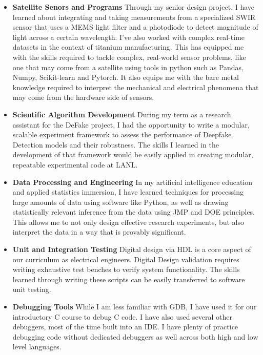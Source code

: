 \begin{itemize}
    \item \textbf{Satellite Senors and Programs} Through my senior 
    design project, I have learned about integrating and taking 
    measurements from a specialized SWIR sensor that uses a MEMS 
    light filter and a photodiode to detect magnitude of light 
    across a certain wavelength. I've also worked with complex 
    real-time datasets in the context of titanium manufacturing. 
    This has equipped me with the skills required to tackle complex, 
    real-world sensor problems, like one that may come from a 
    satellite using tools in python such as Pandas, Numpy, 
    Scikit-learn and Pytorch. It also equips me with the bare metal 
    knowledge required to interpret the mechanical and electrical
    phenomena that may come from the hardware side of sensors.
    
    \item \textbf{Scientific Algorithm Development} During my term 
    as a research assistant for the DeFake project, I had the 
    opportunity to write a modular, scalable experiment framework 
    to assess the performance of Deepfake Detection models and their
    robustness. The skills I learned in the development of that 
    framework would be easily applied in creating modular, repeatable 
    experimental code at LANL.
    
    \item \textbf{Data Processing and Engineering} In my artificial
    intelligence education and applied statistics immersion, I have 
    learned techniques for processing large amounts of data using 
    software like Python, as well as drawing statistically relevant 
    inference from the data using JMP and DOE principles. This allows 
    me to not only design effective research experiments, but also
    interpret the data in a way that is provably significant.
    
    \item \textbf{Unit and Integration Testing} Digital design via HDL 
    is a core aspect of our curriculum as electrical engineers. Digital 
    Design validation requires writing exhaustive test benches to 
    verify system functionality. The skills learned through writing 
    these scripts can be easily transferred to software unit testing.
    
    \item \textbf{Debugging Tools} While I am less familiar with GDB, 
    I have used it for our introductory C course to debug C code. I 
    have also used several other debuggers, most of the time built into 
    an IDE. I have plenty of practice debugging code without dedicated 
    debuggers as well across both high and low level languages.
    

\end{itemize}
